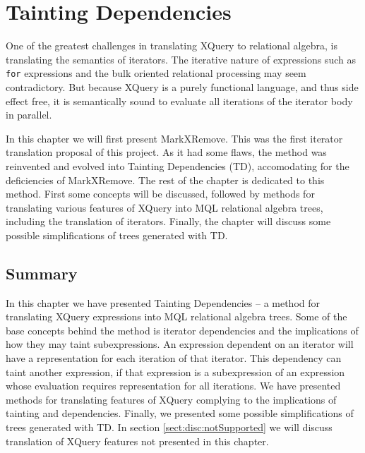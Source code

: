 \chapter{Tainting Dependencies}
\label{sect:translation}
\label{chapter:translation}

One of the greatest challenges in translating XQuery to relational algebra, is translating the semantics of
iterators. The iterative nature of expressions such as \texttt{for} expressions and the bulk oriented relational
processing may seem contradictory. But because XQuery is a purely functional language, and thus side effect free,
it is semantically sound to evaluate all iterations of the iterator body in
parallel.

In this chapter we will first present MarkXRemove. This was the first iterator translation proposal of this
project. As it had some flaws, the method was reinvented and evolved into Tainting Dependencies (TD), accomodating
for the deficiencies of MarkXRemove. The rest of the chapter is dedicated to this method. First some concepts will
be discussed, followed by methods for translating various features of XQuery into MQL relational algebra trees,
including the translation of iterators. Finally, the chapter will discuss some possible simplifications of trees
generated with TD.













\section{Summary}
\label{sect:trans:summary}

In this chapter we have presented Tainting Dependencies -- a method for
translating XQuery expressions into MQL relational algebra trees. Some of the
base concepts behind the method is iterator dependencies and the implications
of how they may taint subexpressions. An expression dependent on an iterator
will have a representation for each iteration of that iterator. This
dependency can taint another expression, if that expression is a subexpression
of an expression whose evaluation requires representation for all iterations.
We have presented methods for translating features of XQuery complying to the
implications of tainting and dependencies. Finally, we presented some possible
simplifications of trees generated with TD. In section
\ref{sect:disc:notSupported} we will discuss translation of XQuery features
not presented in this chapter.
